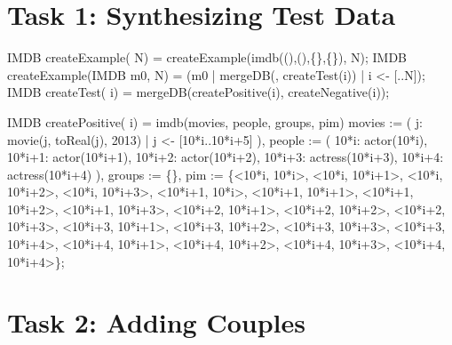 \documentclass[submission,copyright,creativecommons]{eptcs}
\begin{document}
\section{Task 1: Synthesizing Test Data}


\begin{rascal}
IMDB createExample( N) = createExample(imdb((),(),\{{}\}{},\{{}\}{}), N);
IMDB createExample(IMDB m0,  N) = (m0 | mergeDB(, createTest(i)) | i \textless{}- {}[..N]);
IMDB createTest( i) = mergeDB(createPositive(i), createNegative(i));
    
IMDB createPositive( i) = imdb(movies, people, groups, pim)
     movies := ( j: movie(j, toReal(j), 2013) | j \textless{}- {}[10*i..10*i+5] ),
         people := ( 10*i: actor(10*i), 10*i+1: actor(10*i+1), 
                     10*i+2: actor(10*i+2), 10*i+3: actress(10*i+3), 
                     10*i+4: actress(10*i+4) ),
         groups := \{{}\}{},
         pim := \{{}\textless{}10*i, 10*i\textgreater{}, \textless{}10*i, 10*i+1\textgreater{}, \textless{}10*i, 10*i+2\textgreater{}, \textless{}10*i, 10*i+3\textgreater{},
                 \textless{}10*i+1, 10*i\textgreater{}, \textless{}10*i+1, 10*i+1\textgreater{}, \textless{}10*i+1, 10*i+2\textgreater{}, \textless{}10*i+1, 10*i+3\textgreater{},
                 \textless{}10*i+2, 10*i+1\textgreater{}, \textless{}10*i+2, 10*i+2\textgreater{}, \textless{}10*i+2, 10*i+3\textgreater{},
                 \textless{}10*i+3, 10*i+1\textgreater{}, \textless{}10*i+3, 10*i+2\textgreater{}, \textless{}10*i+3, 10*i+3\textgreater{}, \textless{}10*i+3, 10*i+4\textgreater{},
                 \textless{}10*i+4, 10*i+1\textgreater{}, \textless{}10*i+4, 10*i+2\textgreater{}, \textless{}10*i+4, 10*i+3\textgreater{}, \textless{}10*i+4, 10*i+4\textgreater{}\}{};          
\end{rascal}


\section{Task 2: Adding Couples}
\end{document}
